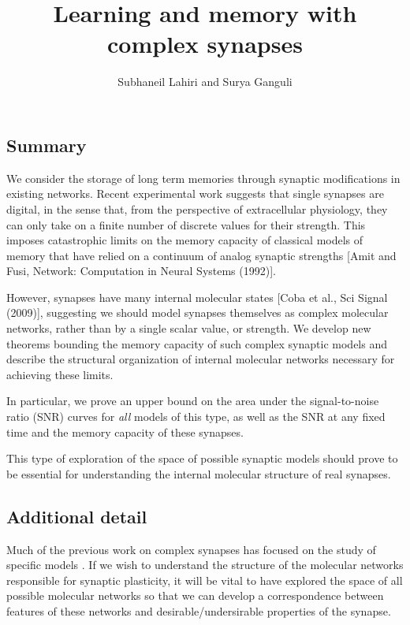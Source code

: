 \documentclass[12pt]{article}
\title{Learning and memory with complex synapses}
\author{Subhaneil Lahiri and Surya Ganguli}
\date{}
\begin{document}
\maketitle



\subsection*{Summary}

We consider the storage of long term memories through synaptic modifications in existing networks.
Recent experimental work suggests that single synapses are digital, in the sense that, from the perspective of extracellular physiology, they can only take on a finite number of discrete values for their strength.
This imposes catastrophic limits on the memory capacity of classical models of memory that have relied on a continuum of analog synaptic strengths [Amit and Fusi, Network: Computation in Neural Systems (1992)]\nocite{amit1992constraints}.

However, synapses have many internal molecular states [Coba et al., Sci Signal (2009)]\nocite{Coba2009phosphorylation}, suggesting we should model synapses themselves as complex molecular networks, rather than by a single scalar value, or strength.
We develop new theorems bounding the memory capacity of such complex synaptic models and describe the structural organization of internal molecular networks necessary for achieving these limits.

In particular, we prove an upper bound on the area under the signal-to-noise ratio (SNR) curves for \emph{all} models of this type, as well as the SNR at any fixed time and the memory capacity of these synapses.

This type of exploration of the space of possible synaptic models should prove to be essential for understanding the internal molecular structure of real synapses.

\subsection*{Additional detail}

Much of the previous work on complex synapses has focused on the study of specific models \cite{amit1994learning,*Fusi2005cascade,*Fusi2007multistate}.
If we wish to understand the structure of the molecular networks responsible for synaptic plasticity, it will be vital to have explored the space of all possible molecular networks so that we can develop a correspondence between features of these networks and desirable/undersirable properties of the synapse.
\end{document}
